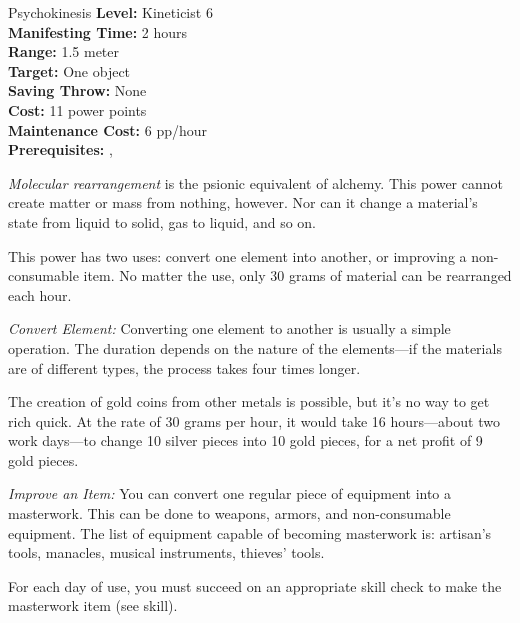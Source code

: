 {Psychokinesis}
{
	\textbf{Level:}
	Kineticist 6\\
	\textbf{Manifesting Time:}
	2 hours\\
	\textbf{Range:}
	1.5 meter\\
	\textbf{Target:}
	One object\\
	\textbf{Saving Throw:}
	None \\
	\textbf{Cost:}
	11 power points\\
	\textbf{Maintenance Cost:}
	6 pp/hour\\
	\textbf{Prerequisites:}
	, \\
}
{
	\emph{Molecular rearrangement} is the psionic equivalent of alchemy. This power cannot create matter or mass from nothing, however. Nor can it change a material's state from liquid to solid, gas to liquid, and so on.%

	This power has two uses: convert one element into another, or improving a non-consumable item. No matter the use, only 30 grams of material can be rearranged each hour.

	\textit{Convert Element:} Converting one element to another is usually a simple operation. The duration depends on the nature of the elements---if the materials are of different types, the process takes four times longer.



	The creation of gold coins from other metals is possible, but it's no way to get rich quick. At the rate of 30 grams per hour, it would take 16 hours---about two work days---to change 10 silver pieces into 10 gold pieces, for a net profit of 9 gold pieces.

	\textit{Improve an Item:} You can convert one regular piece of equipment into a masterwork. This can be done to weapons, armors, and non-consumable equipment. The list of equipment capable of becoming masterwork is: artisan's tools, manacles, musical instruments, thieves' tools.

	For each day of use, you must succeed on an appropriate skill check to make the masterwork item (see  skill).
}